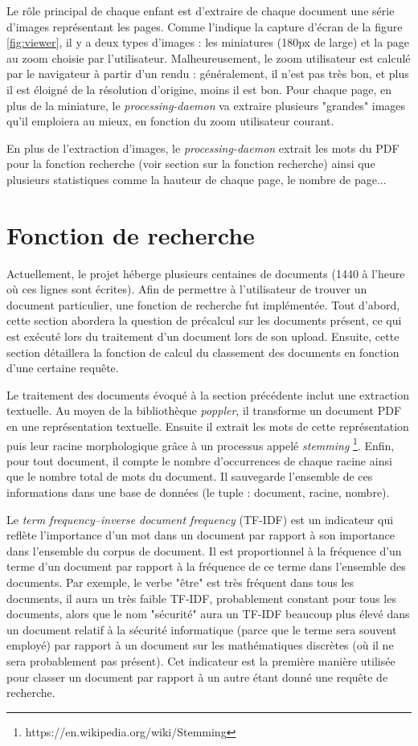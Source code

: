 \documentclass[a4paper,12pt]{article}
\begin{document}
Le rôle principal de chaque enfant est d'extraire de chaque document une série
d'images représentant les pages. Comme l'indique la capture d'écran de la figure \ref{fig:viewer},
il y a deux types d'images : les miniatures (180px de large) et la page au zoom 
choisie par l'utilisateur. Malheureusement, le zoom utilisateur est calculé par
le navigateur à partir d'un rendu : généralement, il n'est pas très bon, et plus il
est éloigné de la résolution d'origine, moins il est bon. Pour chaque page, en
plus de la miniature, le \textit{processing-daemon} va extraire plusieurs "grandes"
images qu'il emploiera au mieux, en fonction du zoom utilisateur courant.

En plus de l'extraction d'images, le \textit{processing-daemon} extrait les mots
du PDF pour la fonction recherche (voir section sur la fonction recherche) ainsi que
plusieurs statistiques comme la hauteur de chaque page, le nombre de page...


\section{Fonction de recherche}

Actuellement, le projet héberge plusieurs centaines de documents (1440 à l'heure où ces lignes sont écrites).
Afin de permettre à l'utilisateur de trouver un document particulier, une
fonction de recherche fut implémentée. Tout d'abord, cette section abordera
la question de précalcul sur les documents présent, ce qui est exécuté lors
du traitement d'un document lors de son upload. Ensuite, cette section
détaillera la fonction de calcul du classement des documents en fonction
d'une certaine requête.

Le traitement des documents évoqué à la section précédente inclut une extraction
textuelle. Au moyen de la bibliothèque \textit{poppler}, il transforme un document
PDF en une représentation textuelle. Ensuite il extrait les mots de cette représentation
puis leur racine morphologique grâce à un processus appelé \textit{stemming}
\footnote{https://en.wikipedia.org/wiki/Stemming}. Enfin, pour tout document,
il compte le nombre d'occurrences de chaque racine ainsi que le nombre total de mots du document.
Il sauvegarde l'ensemble de ces informations dans une base de données (le tuple : document, racine, nombre).

Le \textit{term frequency–inverse document frequency} (TF-IDF) est un indicateur
qui reflète l'importance d'un mot dans un document par rapport à son importance
dans l'ensemble du corpus de document. Il est proportionnel à la fréquence d'un terme
d'un document par rapport à la fréquence de ce terme dans l'ensemble des documents.
Par exemple, le verbe "être" est très fréquent dans tous les documents, il aura
un très faible TF-IDF, probablement constant pour tous les documents,
alors que le nom "sécurité" aura un TF-IDF beaucoup plus élevé dans un document
relatif à la sécurité informatique (parce que le terme sera souvent employé)
par rapport à un document sur les mathématiques discrètes (où il ne sera probablement
pas présent). Cet indicateur est la première manière utilisée pour classer
un document par rapport à un autre étant donné une requête de recherche.
\end{document}
